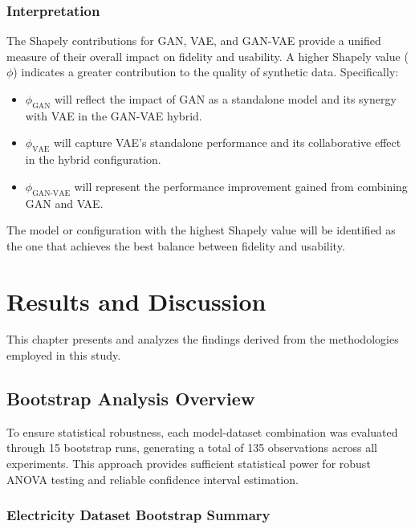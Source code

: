 \documentclass{article}
\begin{document}
\subsubsection{Interpretation}
The Shapely contributions for GAN, VAE, and GAN-VAE provide a unified measure of their overall impact on fidelity and usability. A higher Shapely value (\(\phi\)) indicates a greater contribution to the quality of synthetic data. Specifically:
\begin{itemize}
    \item \(\phi_{\text{GAN}}\) will reflect the impact of GAN as a standalone model and its synergy with VAE in the GAN-VAE hybrid.
    \item \(\phi_{\text{VAE}}\) will capture VAE’s standalone performance and its collaborative effect in the hybrid configuration.
    \item \(\phi_{\text{GAN-VAE}}\) will represent the performance improvement gained from combining GAN and VAE.
\end{itemize}
The model or configuration with the highest Shapely value will be identified as the one that achieves the best balance between fidelity and usability. 

\newpage

\section{Results and Discussion}

This chapter presents and analyzes the findings derived from the methodologies employed in this study.

\subsection{Bootstrap Analysis Overview}
To ensure statistical robustness, each model-dataset combination was evaluated through 15 bootstrap runs, generating a total of 135 observations across all experiments. This approach provides sufficient statistical power for robust ANOVA testing and reliable confidence interval estimation.

\subsubsection{Electricity Dataset Bootstrap Summary}
\end{document}
